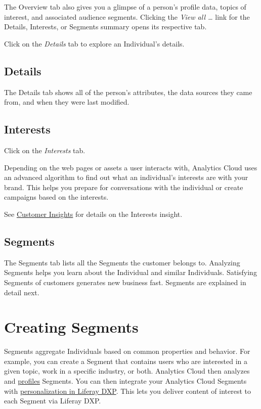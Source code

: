 The Overview tab also gives you a glimpse of a person's profile data,
topics of interest, and associated audience segments. Clicking the
\emph{View all \ldots{}} link for the Details, Interests, or Segments
summary opens its respective tab.

Click on the \emph{Details} tab to explore an Individual's details.

\subsection{Details}\label{details}

The Details tab shows all of the person's attributes, the data sources
they came from, and when they were last modified.

\subsection{Interests}\label{interests}

Click on the \emph{Interests} tab.

Depending on the web pages or assets a user interacts with, Analytics
Cloud uses an advanced algorithm to find out what an individual's
interests are with your brand. This helps you prepare for conversations
with the individual or create campaigns based on the interests.

See
\href{https://github.com/liferay/liferay-docs/blob/7.1.x/discover/analytics-cloud/articles/03-understanding-people/04-customer-insights.markdown}{Customer
Insights} for details on the Interests insight.

\subsection{Segments}\label{segments}

The Segments tab lists all the Segments the customer belongs to.
Analyzing Segments helps you learn about the Individual and similar
Individuals. Satisfying Segments of customers generates new business
fast. Segments are explained in detail next.

\section{Creating Segments}\label{creating-segments}

Segments aggregate Individuals based on common properties and behavior.
For example, you can create a Segment that contains users who are
interested in a given topic, work in a specific industry, or both.
Analytics Cloud then analyzes and
\href{https://help.liferay.com/hc/en-us/articles/360006947851-Profiling-Segments}{profiles}
Segments. You can then integrate your Analytics Cloud Segments with
\href{https://github.com/liferay/liferay-docs/blob/7.1.x/discover/analytics-cloud/articles/03-understanding-people/02-liferay-dxp-personalization.markdown}{personalization
in Liferay DXP}. This lets you deliver content of interest to each
Segment via Liferay DXP.

